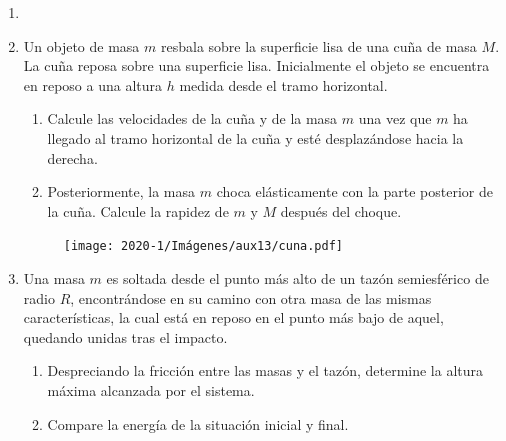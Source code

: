 \documentclass[letterpaper,11pt]{article}
\begin{document}
\vspace{-1cm}
\begin{enumerate}\setlength{\itemsep}{0.4cm}


\item[]

\item Un objeto de masa $m$ resbala sobre la superficie lisa de una cuña de masa $M$. La cuña reposa sobre una superficie lisa. Inicialmente el objeto se encuentra en reposo a una altura $h$ medida desde el tramo horizontal.

\begin{multicols}{2}
    
    \begin{enumerate}
        \item Calcule las velocidades de la cuña y de la masa $m$ una vez que $m$ ha llegado al tramo horizontal de la cuña y esté desplazándose hacia la derecha.
        
        \item Posteriormente, la masa $m$ choca elásticamente con la parte posterior de la cuña. Calcule la rapidez de $m$ y $M$ después del choque.
    \end{enumerate}
    
    \columnbreak
    
    \begin{figure}[H]
        \centering
        \texttt{[image: 2020-1/Imágenes/aux13/cuna.pdf]}
    \end{figure}

\end{multicols}

\item Una masa $m$ es soltada desde el punto más alto de un tazón semiesférico de radio $R$, encontrándose en su camino con otra masa de las mismas características, la cual está en reposo en el punto más bajo de aquel, quedando unidas tras el impacto.

\begin{multicols}{2}

    \begin{enumerate}
        \item Despreciando la fricción entre las masas y el tazón, determine la altura máxima alcanzada por el sistema. 
        \item Compare la energía de la situación inicial y final.
    \end{enumerate}
    

\end{multicols}
\end{enumerate}
\end{document}
